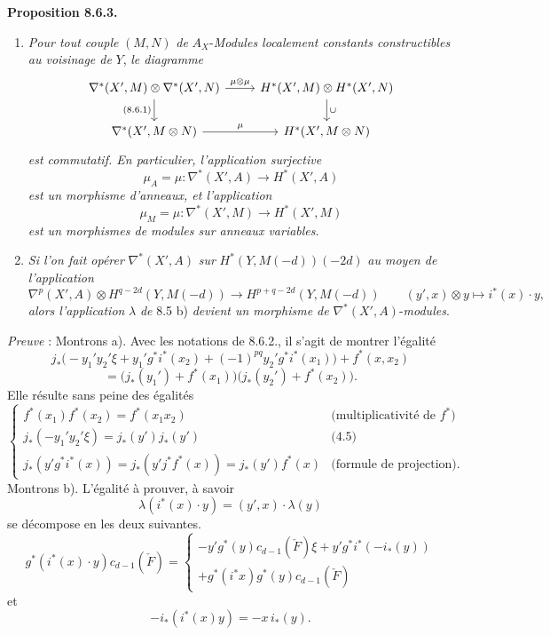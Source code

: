 \documentclass[11pt]{article}
\newenvironment{statement}[1]{\par\medskip\noindent\textbf{#1.}\ }{\par\medskip}
\begin{document}
\begin{statement}{Proposition 8.6.3}
\begin{enumerate}[label=\alph*)]
\item \emph{Pour tout couple} $(M,N)$ \emph{de} $A_X$-\emph{Modules localement constants constructibles au voisinage de} $Y$, \emph{le diagramme}
\[
\begin{tikzcd}
\nabla^*(X',M)\otimes\nabla^*(X',N)\arrow[r,"\mu\otimes\mu"]\arrow[d,"{(8.6.1)}"']&
H^*(X',M)\otimes H^*(X',N)\arrow[d,"\cup"]\\
\nabla^*(X',M\otimes N)\arrow[r,"\mu"]&
H^*(X',M\otimes N)
\end{tikzcd}
\]
\emph{est commutatif. En particulier, l'application surjective}
\[
\mu_A=\mu:\nabla^*(X',A)\to H^*(X',A)
\]
\emph{est un morphisme d'anneaux, et l'application}
\[
\mu_M=\mu:\nabla^*(X',M)\to H^*(X',M)
\]
\emph{est un morphismes de modules sur anneaux variables}.
\item \emph{Si l'on fait opérer} $\nabla^*(X',A)$ \emph{sur} $H^*(Y,M(-d))(-2d)$ \emph{au moyen de l'application}
\[
\nabla^p(X',A)\otimes H^{q-2d}(Y,M(-d))
\to H^{p+q-2d}(Y,M(-d))
\qquad
(y',x)\otimes y\mapsto i^*(x)\cdot y,
\]
\emph{alors l'application} $\lambda$ \emph{de} 8.5 b) \emph{devient un morphisme de} $\nabla^*(X',A)$-\emph{modules}.
\end{enumerate}
\end{statement}

\emph{Preuve} : Montrons a). Avec les notations de 8.6.2., il s'agit de montrer l'égalité
\[
j_*\bigl(-y_1'y_2'\xi+y_1'g^*i^*(x_2)+(-1)^{pq}y_2'g^*i^*(x_1)\bigr)+f^*(x,x_2)
\]
\[
=\bigl(j_*(y_1')+f^*(x_1)\bigr)\bigl(j_*(y_2')+f^*(x_2)\bigr).
\]
Elle résulte sans peine des égalités
\[
\begin{cases}
f^*(x_1)f^*(x_2)=f^*(x_1x_2)&\text{(multiplicativité de }f^*\text{)}\\
j_*(-y_1'y_2'\xi)=j_*(y')j_*(y')&\text{(4.5)}\\
j_*(y'g^*i^*(x))=j_*(y'j^*f^*(x))=j_*(y')f^*(x)&\text{(formule de projection)}.
\end{cases}
\]
Montrons b). L'égalité à prouver, à savoir
\[
\lambda(i^*(x)\cdot y)=(y',x)\cdot\lambda(y)
\]
se décompose en les deux suivantes.
\[
g^*(i^*(x)\cdot y)c_{d-1}(\check F)
=
\begin{cases}
-y'g^*(y)c_{d-1}(\check F)\xi+y'g^*i^*(-i_*(y))\\
+g^*(i^*x)g^*(y)c_{d-1}(\check F)
\end{cases}
\]
et
\[
-i_*(i^*(x)y)=-x\,i_*(y).
\]
\end{document}
